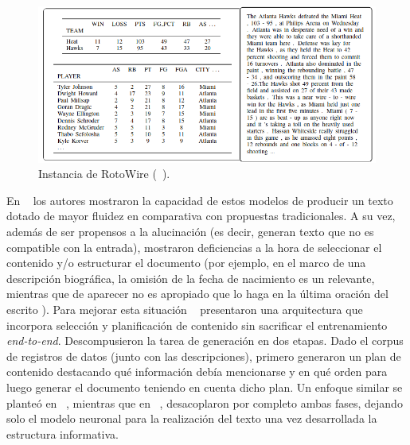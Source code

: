         \begin{figure}[!]
            \begin{center}
                \includegraphics[width=\textwidth]{Graphics/rotowire_instancia.png}
            \end{center}
            \caption{Instancia de RotoWire (~\cite{wiseman-etal-2017-challenges}).}
            \label{fig_RotoWire}
        \end{figure}

 En ~\cite{wiseman-etal-2017-challenges} los autores mostraron la capacidad de estos modelos de producir un texto dotado de mayor 
fluidez en comparativa con propuestas tradicionales. A su vez, además de ser propensos a la alucinación (es decir, generan texto que no es compatible con la entrada), 
mostraron  deficiencias a la hora de seleccionar el contenido y/o estructurar el documento (por ejemplo, en el marco de una descripción biográfica, la omisión de la fecha de nacimiento es un relevante, 
mientras que de aparecer no es apropiado que lo haga en la última oración del escrito ). Para mejorar esta situación ~\cite{puduppully2019dataselandplan}  
presentaron una arquitectura que incorpora selección y planificación de contenido sin sacrificar el entrenamiento \emph{end-to-end}. Descompusieron la tarea de generación en dos etapas. Dado el corpus de 
registros de datos (junto con las descripciones), primero generaron un plan de contenido destacando qué información debía mencionarse y en qué orden para luego generar el documento teniendo en 
cuenta dicho plan. Un enfoque similar se planteó en ~\cite{chen2021neural}, mientras que en ~\cite{moryossef2019step}, desacoplaron por completo ambas fases, dejando solo el modelo neuronal para la realización del 
texto una vez desarrollada la estructura informativa.

